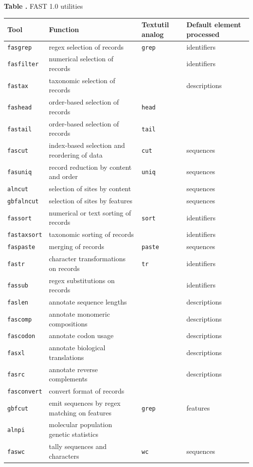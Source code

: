 \documentclass{frontiersSCNS} %
\begin{document}
\begin{table}[!t]
\textbf{\label{tab:01} Table .}{
  FAST 1.0 utilities }

\processtable{ }
{\begin{tabular}{llll}\toprule
    Tool  & Function  & Textutil analog & Default element processed  \\
\midrule
    {\tt fasgrep} & regex selection of records & {\tt grep} & identifiers\\
    {\tt fasfilter} & numerical selection of records &  & identifiers \\
    {\tt fastax} & taxonomic selection of records &  & descriptions \\
    {\tt fashead} & order-based selection of records & {\tt head} & \\
    {\tt fastail} & order-based selection of records &  {\tt tail}  &  \\
    {\tt fascut} & index-based selection and reordering of data  &  {\tt cut}  & sequences \\
    {\tt fasuniq} &  record reduction by content and order & {\tt uniq} & sequences \\
    {\tt alncut} & selection of sites by content &  & sequences \\
    {\tt gbfalncut} & selection of sites by features &  & sequences \\
    {\tt fassort} & numerical or text sorting of records  & {\tt sort} & identifiers\\
    {\tt fastaxsort} & taxonomic sorting of records &  & identifiers \\
    {\tt faspaste} & merging of records &  {\tt paste} & sequences \\
    {\tt fastr} & character transformations on records & {\tt tr} & identifiers\\
    {\tt fassub} & regex substitutions on records &  & identifiers \\
    {\tt faslen} & annotate sequence lengths &  & descriptions \\
    {\tt fascomp} & annotate monomeric compositions &  & descriptions \\
    {\tt fascodon} & annotate codon usage &  & descriptions \\
    {\tt fasxl} & annotate biological translations &  & descriptions \\
    {\tt fasrc} & annotate reverse complements &  & descriptions \\
    {\tt fasconvert} & convert format of records &  &  \\
    {\tt gbfcut} & emit sequences by regex matching on features  & {\tt grep}  & features\\
    {\tt alnpi} & molecular population genetic statistics &  &  \\
    {\tt faswc} & tally sequences and characters & {\tt wc} & sequences \\
\end{tabular}}{}
\end{table}
\end{document}
